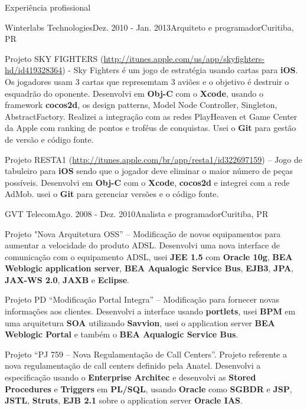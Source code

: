 \documentclass{resume}
\begin{document}
\begin{rSection}{Experiência profissional}
\begin{rSubsection}{Winterlabs Technologies}{Dez. 2010 - Jan. 2013}{Arquiteto e programador}{Curitiba, PR}
    \item Projeto SKY FIGHTERS (\url{http://itunes.apple.com/us/app/skyfighters-hd/id419328364}) - Sky Fighters é um jogo de estratégia usando cartas para \textbf{iOS}. Os jogadores usam 3 cartas que represemtam 3 aviões e o objetivo é destruir o esquadrão do oponente. Desenvolvi em \textbf{Obj-C} com o \textbf{Xcode}, usando o framework \textbf{cocos2d}, os design patterns, Model Node Controller, Singleton, AbstractFactory. Realizei a integração com as redes PlayHeaven et Game Center da Apple com ranking de pontos e troféus de conquistas. Usei o \textbf{Git} para gestão de versão e código fonte. \\
    \item Projeto RESTA1 (\url{http://itunes.apple.com/br/app/resta1/id322697159}) – Jogo de tabuleiro para \textbf{iOS} sendo que o jogador deve eliminar o maior número de peças possíveis. Desenvolvi em \textbf{Obj-C} com o \textbf{Xcode}, \textbf{cocos2d} e integrei com a rede AdMob. usei o \textbf{Git} para gerenciar versões e o código fonte.
    \end{rSubsection}
    \begin{rSubsection}{GVT Telecom}{Ago. 2008 - Dez. 2010}{Analista e programador}{Curitiba, PR}
    \item Projeto "Nova Arquitetura OSS” – Modificação de novos equipamentos para aumentar a velocidade do produto ADSL. Desenvolvi uma nova interface de comunicação com o equipamento ADSL, usei \textbf{JEE 1.5} com \textbf{Oracle 10g}, \textbf{BEA Weblogic application server}, \textbf{BEA Aqualogic Service Bus}, \textbf{EJB3}, \textbf{JPA}, \textbf{JAX-WS 2.0}, \textbf{JAXB} e \textbf{Eclipse}.\\
    \item Projeto PD “Modificação Portal Integra” – Modificação para fornecer novas informações aos clientes. Desenvolvi a interface usando \textbf{portlets}, usei \textbf{BPM} em uma arquitetura \textbf{SOA} utilizando \textbf{Savvion}, usei o application server \textbf{BEA Weblogic Portal} e também o \textbf{BEA Aqualogic Service Bus}.\\
    \item Projeto “PJ 759 – Nova Regulamentação de Call Centers”. Projeto referente a nova regulamentação de call centers definido pela Anatel. Desenvolvi a especificação usando o \textbf{Enterprise Architec} e desenvolvi as \textbf{Stored Procedures} e \textbf{Triggers} em \textbf{PL/SQL}, usando \textbf{Oracle} como \textbf{SGBDR} e \textbf{JSP}, \textbf{JSTL}, \textbf{Struts}, \textbf{EJB 2.1} sobre o application server \textbf{Oracle IAS}.\\

\end{rSubsection}
\end{rSection}
\end{document}
